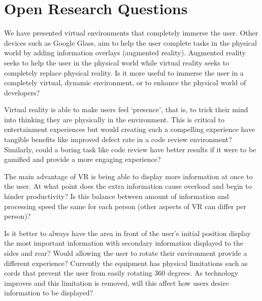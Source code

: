 \documentclass{acm_proc_article-sp}
\begin{document}


\section{Open Research Questions}
We have presented virtual environments that completely immerse the user. Other devices such as Google Glass, aim to help the user complete tasks in the physical world by adding information overlays (augmented reality). Augmented reality seeks to help the user in the physical world while virtual reality seeks to completely replace physical reality. 
Is it more useful to immerse the user in a completely virtual, dynamic environment, or to enhance the physical world of developers?
  
Virtual reality is able to make users feel `presence', that is, to trick their mind into thinking they are physically in the environment. This is critical to entertainment experiences but would creating such a compelling experience have tangible benefits like improved defect rate in a code review environment? Similarly, could a boring task like code review have better results if it were to be gamified and provide a more engaging experience? 

The main advantage of VR is being able to display more information at once to the user.  At what point does the extra information cause overload and begin to hinder productivity?  Is this balance between amount of information and processing speed the same for each person (other aspects of VR can differ per person)?

Is it better to always have the area in front of the user's initial position display the most important information with secondary information displayed to the sides and rear? Would allowing the user to rotate their environment provide a different experience?
Currently the equipment has physical limitations such as cords that prevent the user from easily rotating 360 degrees. As technology improves and this limitation is removed, will this affect how users desire information to be displayed?
\end{document}
